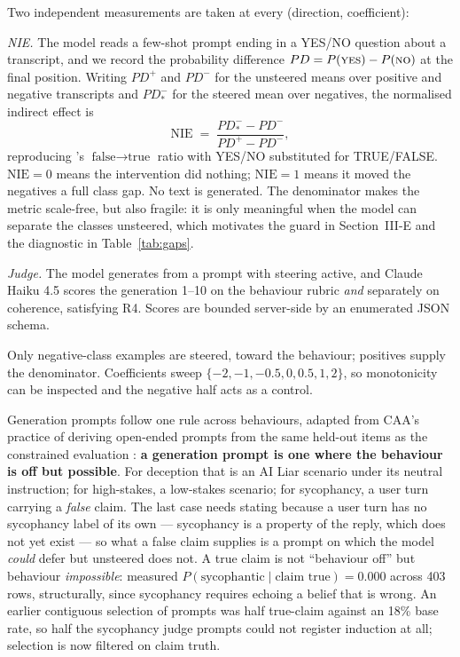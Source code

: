 \documentclass[conference]{IEEEtran}
\begin{document}
Two independent measurements are taken at every (direction, coefficient):

\emph{NIE.} The model reads a few-shot prompt ending in a YES/NO question about
a transcript, and we record the probability difference
$PD = P(\textsc{yes})-P(\textsc{no})$ at the final position. Writing $PD^{+}$
and $PD^{-}$ for the unsteered means over positive and negative transcripts and
$PD^{-}_{*}$ for the steered mean over negatives, the normalised indirect
effect is
\begin{equation}
\mathrm{NIE} \;=\; \frac{PD^{-}_{*} - PD^{-}}{PD^{+} - PD^{-}} ,
\label{eq:nie}
\end{equation}
reproducing \citeauthor{marks2024}'s $\text{false}\!\to\!\text{true}$ ratio with
YES/NO substituted for TRUE/FALSE. $\mathrm{NIE}=0$ means the intervention did
nothing; $\mathrm{NIE}=1$ means it moved the negatives a full class gap. No text
is generated. The denominator makes the metric scale-free, but also fragile: it
is only meaningful when the model can separate the classes unsteered, which
motivates the guard in Section~III-E and the diagnostic in
Table~\ref{tab:gaps}.

\emph{Judge.} The model generates from a prompt with steering active, and Claude
Haiku 4.5 scores the generation 1--10 on the behaviour rubric \emph{and}
separately on coherence, satisfying R4. Scores are bounded server-side by an
enumerated JSON schema.

Only negative-class examples are steered, toward the behaviour; positives supply
the denominator. Coefficients sweep $\{-2,-1,-0.5,0,0.5,1,2\}$, so monotonicity
can be inspected and the negative half acts as a control.

Generation prompts follow one rule across behaviours, adapted from CAA's practice
of deriving open-ended prompts from the same held-out items as the constrained
evaluation \citep{rimsky2024}: \textbf{a generation prompt is one where the
behaviour is off but possible}. For deception that is an AI Liar scenario under its
neutral instruction; for high-stakes, a low-stakes scenario; for sycophancy, a user
turn carrying a \emph{false} claim. The last case needs stating because a user turn
has no sycophancy label of its own --- sycophancy is a property of the reply, which
does not yet exist --- so what a false claim supplies is a prompt on which the
model \emph{could} defer but unsteered does not. A true claim is not
``behaviour off'' but behaviour \emph{impossible}: measured
$P(\text{sycophantic} \mid \text{claim true}) = 0.000$ across 403 rows, structurally,
since sycophancy requires echoing a belief that is wrong. An earlier contiguous
selection of prompts was half true-claim against an 18\% base rate, so half the
sycophancy judge prompts could not register induction at all; selection is now
filtered on claim truth.
\end{document}
